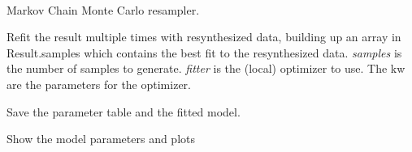 \documentclass[letterpaper,10pt,english]{sphinxmanual}
\begin{document}
\begin{fulllineitems}
\label{api/fitproblem:refl1d.fitproblem.Result}~

\begin{fulllineitems}
\label{api/fitproblem:refl1d.fitproblem.Result.mcmc}
Markov Chain Monte Carlo resampler.

\end{fulllineitems}


\begin{fulllineitems}
\label{api/fitproblem:refl1d.fitproblem.Result.plot}
\end{fulllineitems}


\begin{fulllineitems}
\label{api/fitproblem:refl1d.fitproblem.Result.resample}
Refit the result multiple times with resynthesized data, building
up an array in Result.samples which contains the best fit to the
resynthesized data.  \emph{samples} is the number of samples to generate.
\emph{fitter} is the (local) optimizer to use. The kw are the parameters
for the optimizer.

\end{fulllineitems}


\begin{fulllineitems}
\label{api/fitproblem:refl1d.fitproblem.Result.save}
Save the parameter table and the fitted model.

\end{fulllineitems}


\begin{fulllineitems}
\label{api/fitproblem:refl1d.fitproblem.Result.show}
Show the model parameters and plots


\end{fulllineitems}
\end{fulllineitems}
\end{document}
